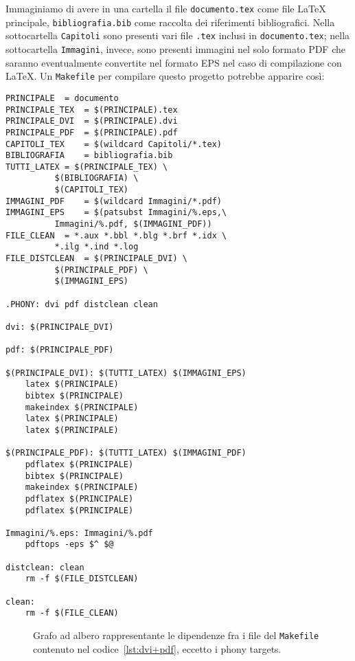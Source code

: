 Immaginiamo di avere in una cartella il file \texttt{documento.tex} come file
\LaTeX{}
principale, \texttt{bibliografia.bib} come raccolta dei riferimenti
bibliografici.  Nella sottocartella \texttt{Capitoli} sono presenti vari file
\texttt{.tex} inclusi in \texttt{documento.tex}; nella sottocartella
\texttt{Immagini}, invece, sono presenti immagini nel solo formato \textsc{PDF}
che saranno eventualmente convertite nel formato \textsc{EPS} nel caso di
compilazione con \LaTeX.  Un \texttt{Makefile} per compilare questo progetto
potrebbe apparire così:
\begin{lstlisting}[caption={\texttt{Makefile} in cui la prima regola compila il
documento in \textsc{DVI} convertendo le immagini \textsc{PDF} in \textsc{EPS},
la seconda regola compila in formato \textsc{PDF}.},
label=lst:dvi+pdf]
PRINCIPALE 	= documento
PRINCIPALE_TEX	= $(PRINCIPALE).tex
PRINCIPALE_DVI	= $(PRINCIPALE).dvi
PRINCIPALE_PDF	= $(PRINCIPALE).pdf
CAPITOLI_TEX	= $(wildcard Capitoli/*.tex)
BIBLIOGRAFIA	= bibliografia.bib
TUTTI_LATEX	= $(PRINCIPALE_TEX) \
		  $(BIBLIOGRAFIA) \
		  $(CAPITOLI_TEX)
IMMAGINI_PDF	= $(wildcard Immagini/*.pdf)
IMMAGINI_EPS	= $(patsubst Immagini/%.eps,\
		  Immagini/%.pdf, $(IMMAGINI_PDF))
FILE_CLEAN	= *.aux *.bbl *.blg *.brf *.idx \
		  *.ilg *.ind *.log
FILE_DISTCLEAN	= $(PRINCIPALE_DVI) \
		  $(PRINCIPALE_PDF) \
		  $(IMMAGINI_EPS)

.PHONY: dvi pdf distclean clean

dvi: $(PRINCIPALE_DVI)

pdf: $(PRINCIPALE_PDF)

$(PRINCIPALE_DVI): $(TUTTI_LATEX) $(IMMAGINI_EPS)
	latex $(PRINCIPALE)
	bibtex $(PRINCIPALE)
	makeindex $(PRINCIPALE)
	latex $(PRINCIPALE)
	latex $(PRINCIPALE)

$(PRINCIPALE_PDF): $(TUTTI_LATEX) $(IMMAGINI_PDF)
	pdflatex $(PRINCIPALE)
	bibtex $(PRINCIPALE)
	makeindex $(PRINCIPALE)
	pdflatex $(PRINCIPALE)
	pdflatex $(PRINCIPALE)

Immagini/%.eps: Immagini/%.pdf
	pdftops -eps $^ $@

distclean: clean
	rm -f $(FILE_DISTCLEAN)

clean:
	rm -f $(FILE_CLEAN)
\end{lstlisting}
\begin{figure}
  \centering
  \caption{Grafo ad albero rappresentante le dipendenze fra i file del
    \texttt{Makefile} contenuto nel codice~\ref{lst:dvi+pdf}, eccetto i phony
    targets.}
  \label{fig:grafo-albero2}
\end{figure}
